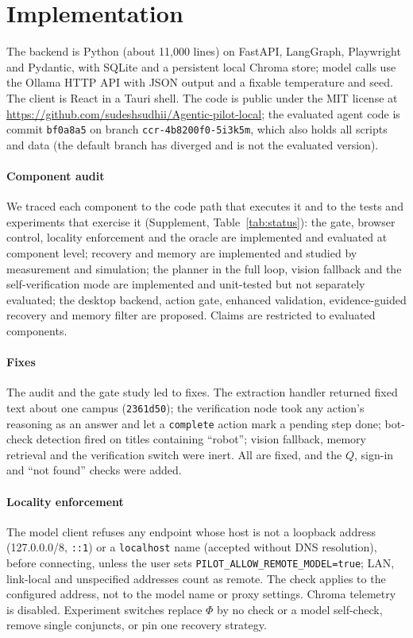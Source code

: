 \section{Implementation}
\label{sec:impl}

The backend is Python (about 11{,}000 lines) on FastAPI, LangGraph, Playwright and Pydantic, with SQLite and a persistent local Chroma store; model calls use the Ollama HTTP API with JSON output and a fixable temperature and seed. The client is React in a Tauri shell. The code is public under the MIT license at \url{https://github.com/sudeshsudhii/Agentic-pilot-local}; the evaluated agent code is commit \texttt{bf0a8a5} on branch \texttt{ccr-4b8200f0-5i3k5m}, which also holds all scripts and data (the default branch has diverged and is not the evaluated version).

\paragraph{Component audit} We traced each component to the code path that executes it and to the tests and experiments that exercise it (Supplement, Table~\ref{tab:status}): the gate, browser control, locality enforcement and the oracle are implemented and evaluated at component level; recovery and memory are implemented and studied by measurement and simulation; the planner in the full loop, vision fallback and the self-verification mode are implemented and unit-tested but not separately evaluated; the desktop backend, action gate, enhanced validation, evidence-guided recovery and memory filter are proposed. Claims are restricted to evaluated components.


\paragraph{Fixes} The audit and the gate study led to fixes. The extraction handler returned fixed text about one campus (\texttt{2361d50}); the verification node took any action's reasoning as an answer and let a \texttt{complete} action mark a pending step done; bot-check detection fired on titles containing ``robot''; vision fallback, memory retrieval and the verification switch were inert. All are fixed, and the $Q$, sign-in and ``not found'' checks were added.

\paragraph{Locality enforcement} The model client refuses any endpoint whose host is not a loopback address (127.0.0.0/8, \texttt{::1}) or a \texttt{localhost} name (accepted without DNS resolution), before connecting, unless the user sets \texttt{PILOT\_ALLOW\_REMOTE\_MODEL=true}; LAN, link-local and unspecified addresses count as remote. The check applies to the configured address, not to the model name or proxy settings. Chroma telemetry is disabled. Experiment switches replace $\Phi$ by no check or a model self-check, remove single conjuncts, or pin one recovery strategy.
